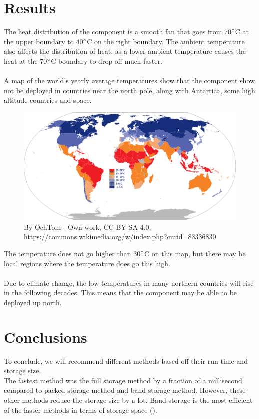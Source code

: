 \documentclass[12pt,a4paper]{article}
\begin{document}
\section{Results}
The heat distribution of the component is a smooth fan that goes from 70$\degree$C at the upper boundary to 40$\degree$C on the right boundary. The ambient temperature also affects the distribution of heat, as a lower ambient temperature causes the heat at the 70$\degree$C boundary to drop off much faster. \\\\A map of the world's yearly average temperatures show that the component show not be deployed in countries near the north pole, along with Antartica, some high altitude countries and space. 
\begin{figure}[H]
	\center
	\includegraphics[width=0.9\linewidth]{images/Average_yearly_temperature_per_country.png}
	\caption{By OchTom - Own work, CC BY-SA 4.0, https://commons.wikimedia.org/w/index.php?curid=83336830}
\end{figure}
The temperature does not go higher than 30$\degree$C on this map, but there may be local regions where the temperature does go this high. 
\\\\
Due to climate change, the low temperatures in many northern countries will rise in the following decades. This means that the component may be able to be deployed up north. 
\section{Conclusions}
To conclude, we will recommend different methods based off their run time and storage size.\\The fastest method was the full storage method by a fraction of a millisecond compared to packed storage method and band storage method. However, these other methods reduce the storage size by a lot. Band storage is the most efficient of the faster methods in terms of storage space ().
\pagebreak
\end{document}
